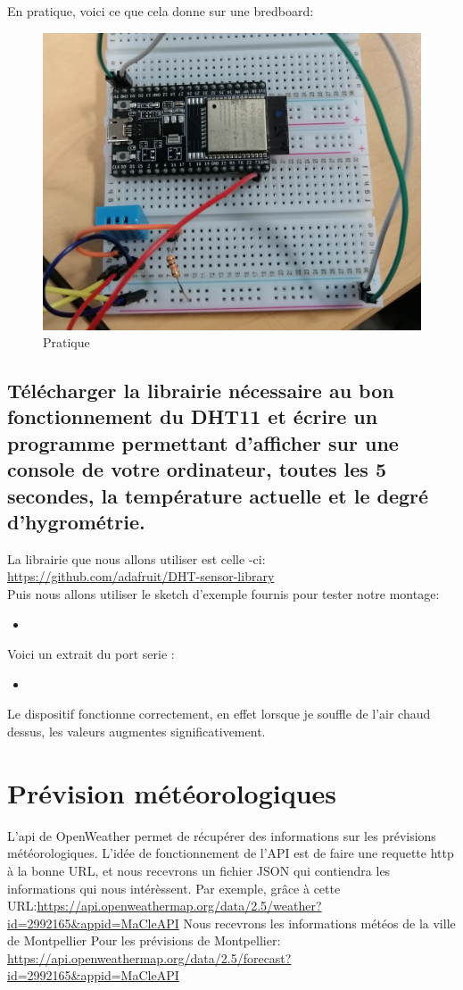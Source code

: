 \documentclass[10pt,a4paper]{article}
\newcommand{\insertcode}[2]{\begin{itemize}\item[]\end{itemize}}
\begin{document}
En pratique, voici ce que cela donne sur une bredboard:
\begin{figure}[h!]
\centering
 \includegraphics[scale=0.15]{image/2.jpg}
\caption{Pratique}
\label{fig:net }
\end{figure}\newpage
 \subsection{Télécharger  la  librairie  nécessaire  au  bon  fonctionnement  du  DHT11  et  écrire  un  programme permettant  d’afficher  sur  une  console  de  votre  ordinateur,  toutes  les  5  secondes,  la  température actuelle et le degré d’hygrométrie.}
 La librairie que nous allons utiliser est celle -ci: \url{https://github.com/adafruit/DHT-sensor-library}\\
 Puis nous allons utiliser le sketch d'exemple fournis pour tester notre montage:
 \insertcode{code/dht11/dht11.ino}{Le sketch exemple}
 Voici un extrait du port serie :
 \insertcode{code/1.txt}{STDOUT}
Le dispositif fonctionne correctement, en effet lorsque je souffle de l'air chaud dessus, les valeurs augmentes significativement.

\section{Prévision météorologiques }
 L'api de OpenWeather permet de récupérer des informations sur les  prévisions  météorologiques.
 L'idée de fonctionnement de l'API est de faire une requette http à la bonne URL, et nous recevrons un fichier JSON qui contiendra les informations qui nous intérèssent.
 Par exemple, grâce à cette URL:\url{https://api.openweathermap.org/data/2.5/weather?id=2992165&appid=MaCleAPI}
 Nous recevrons les informations météos de la ville de Montpellier
Pour les prévisions de Montpellier:
\url{https://api.openweathermap.org/data/2.5/forecast?id=2992165&appid=MaCleAPI}
\end{document}
